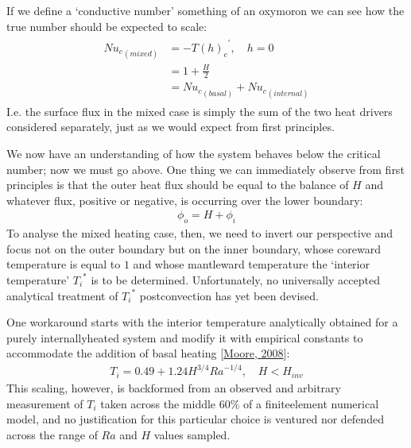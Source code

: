 \documentclass[letterpaper,10pt,english]{jupyterBook}
\begin{document}
\sphinxAtStartPar
If we define a ‘conductive  number’ \sphinxhyphen{} something of an oxymoron \sphinxhyphen{} we can see how the true  number should be expected to scale:
\begin{equation*}
\begin{split} \begin{align*}
{{Nu}_{c}}_{(mixed)} &= -{{T(h)}_{c}}^{'}, \quad h = 0 \\
&= 1 + \frac{H}{2} \\
&= {{Nu}_{c}}_{(basal)} + {{Nu}_{c}}_{(internal)}
\end{align*} \end{split}
\end{equation*}
\sphinxAtStartPar
I.e. the surface flux in the mixed case is simply the sum of the two heat drivers considered separately, just as we would expect from first principles.

\sphinxAtStartPar
We now have an understanding of how the system behaves below the critical  number; now we must go above. One thing we can immediately observe from first principles is that the outer heat flux should be equal to the balance of \(H\) and whatever flux, positive or negative, is occurring over the lower boundary:
\begin{equation*}
\begin{split}
{\phi}_o = H + {\phi}_i
\end{split}
\end{equation*}
\sphinxAtStartPar
To analyse the mixed heating case, then, we need to invert our perspective and focus not on the outer boundary but on the inner boundary, whose core\sphinxhyphen{}ward temperature is equal to \(1\) and whose mantle\sphinxhyphen{}ward temperature \sphinxhyphen{} the ‘interior temperature’ \({T_i}^{*}\) \sphinxhyphen{} is to be determined. Unfortunately, no universally accepted analytical treatment of \({T_i}^{*}\) post\sphinxhyphen{}convection has yet been devised.

\sphinxAtStartPar
One workaround starts with the interior temperature analytically obtained for a purely internally\sphinxhyphen{}heated system and modify it with empirical constants to accommodate the addition of basal heating {[}\hyperlink{cite.references:id667}{Moore, 2008}{]}:
\begin{equation*}
\begin{split}
T_i = 0.49 + 1.24 H^{3/4} {Ra}^{-1/4}, \quad H < H_{inv}
\end{split}
\end{equation*}
\sphinxAtStartPar
This scaling, however, is back\sphinxhyphen{}formed from an observed and arbitrary measurement of \(T_i\) taken across the middle 60\% of a finite\sphinxhyphen{}element numerical model, and no justification for this particular choice is ventured nor defended across the range of \(Ra\) and \(H\) values sampled.
\end{document}
